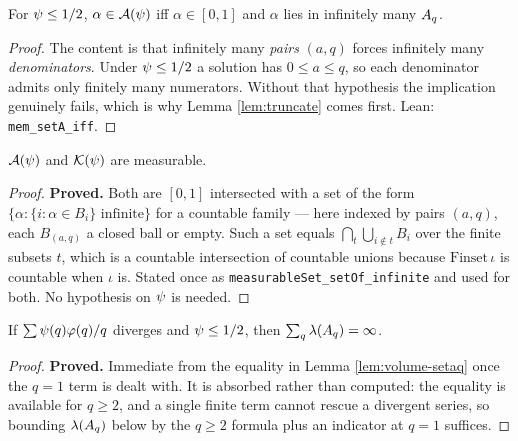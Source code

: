 \begin{lemma}
  \label{lem:seta-limsup}
  \leanok
  For $\psi \leq 1/2$, $\alpha \in \mathcal{A}(\psi)$ iff $\alpha \in [0,1]$ and $\alpha$ lies in
  infinitely many $A_q$.
\end{lemma}

\begin{proof}
  The content is that infinitely many \emph{pairs} $(a,q)$ forces infinitely many
  \emph{denominators}. Under $\psi \leq 1/2$ a solution has $0 \leq a \leq q$, so each
  denominator admits only finitely many numerators. Without that hypothesis the
  implication genuinely fails, which is why Lemma \ref{lem:truncate} comes first.
  Lean: \texttt{mem\_setA\_iff}.
\end{proof}

\begin{lemma}
  \label{lem:measurable-seta}
  \leanok
  $\mathcal{A}(\psi)$ and $\mathcal{K}(\psi)$ are measurable.
\end{lemma}

\begin{proof}
  \leanok
  \textbf{Proved.} Both are $[0,1]$ intersected with a set of the form
  $\{\alpha : \{i : \alpha \in B_i\} \text{ infinite}\}$ for a countable family --- here
  indexed by pairs $(a,q)$, each $B_{(a,q)}$ a closed ball or empty. Such a set equals
  $\bigcap_{t} \bigcup_{i \notin t} B_i$ over the finite subsets $t$, which is a countable
  intersection of countable unions because $\mathrm{Finset}\,\iota$ is countable when
  $\iota$ is. Stated once as \texttt{measurableSet\_setOf\_infinite} and used for both.
  No hypothesis on $\psi$ is needed.
\end{proof}

\begin{lemma}
  \label{lem:divergence}
  \leanok
  If $\sum \psi(q)\varphi(q)/q$ diverges and $\psi \leq 1/2$, then
  $\sum_q \lambda(A_q) = \infty$.
\end{lemma}

\begin{proof}
  \leanok
  \textbf{Proved.} Immediate from the equality in Lemma \ref{lem:volume-setaq} once the
  $q = 1$ term is dealt with. It is absorbed rather than computed: the equality is
  available for $q \geq 2$, and a single finite term cannot rescue a divergent series,
  so bounding $\lambda(A_q)$ below by the $q \ge 2$ formula plus an indicator at $q = 1$
  suffices.
\end{proof}

